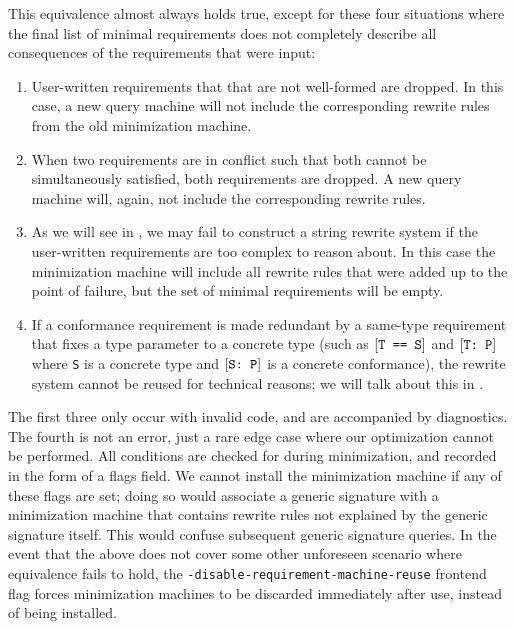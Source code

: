 \documentclass[../generics]{subfiles}
\begin{document}
This equivalence almost always holds true, except for these four situations where the final list of minimal requirements does not completely describe all consequences of the requirements that were input:
\begin{enumerate}
\item User-written requirements that that are not well-formed are dropped. In this case, a new query machine will not include the corresponding rewrite rules from the old minimization machine.

\item When two requirements are in conflict such that both cannot be simultaneously satisfied, both requirements are dropped. A new query machine will, again, not include the corresponding rewrite rules.

\item As we will see in , we may fail to construct a string rewrite system if the user-written requirements are too complex to reason about. In this case the minimization machine will include all rewrite rules that were added up to the point of failure, but the set of minimal requirements will be empty.

\item If a conformance requirement is made redundant by a same-type requirement that fixes a type parameter to a concrete type (such as $[\texttt{T == S}]$ and $[\texttt{T:~P}]$ where \texttt{S} is a concrete type and $[\texttt{S:~P}]$ is a concrete conformance), the rewrite system cannot be reused for technical reasons; we will talk about this in .
\end{enumerate}

The first three only occur with invalid code, and are accompanied by diagnostics. The fourth is not an error, just a rare edge case where our optimization cannot be performed. All conditions are checked for during minimization, and recorded in the form of a flags field. We cannot install the minimization machine if any of these flags are set; doing so would associate a generic signature with a minimization machine that contains rewrite rules not explained by the generic signature itself. This would confuse subsequent generic signature queries. In the event that the above does not cover some other unforeseen scenario where equivalence fails to hold, the \texttt{-disable-requirement-machine-reuse} frontend flag forces minimization machines to be discarded immediately after use, instead of being installed.
\end{document}
